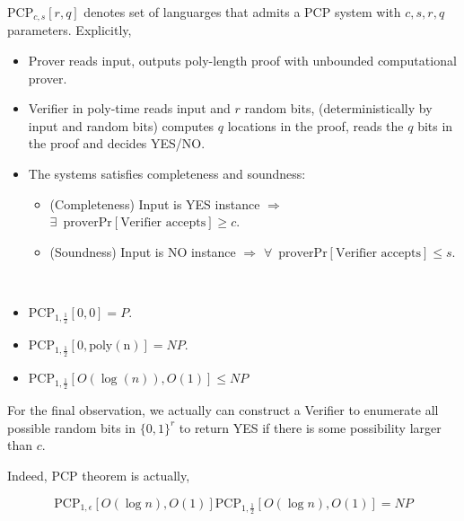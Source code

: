 \begin{definition}
    $ \mathrm{PCP}_{c,s}[r,q] $ denotes set of languarges that admits a PCP system with  $ c,s,r,q  $ parameters. Explicitly,
    \begin{itemize}
        \item Prover reads input, outputs poly-length proof with unbounded computational prover.
        \item Verifier in poly-time reads input and  $ r $ random bits, (deterministically by input and random bits) computes  $ q $ locations in the proof, reads the  $ q $ bits in the proof and decides YES/NO.
        \item The systems satisfies  completeness and soundness:
        \begin{itemize}
            \item (Completeness) Input is YES instance  $ \Rightarrow  $  $ \exists\,\text{ prover}\mathrm{Pr}[\text{Verifier accepts}] \geq c $.
            \item (Soundness) Input is NO instance  $ \Rightarrow  $  $ \forall\,\text{ prover}\mathrm{Pr}[\text{Verifier accepts}] \leq s $. 
        \end{itemize}
    \end{itemize}
\end{definition}
\begin{observation}
    \,
    \begin{itemize}
        \item  $ \mathrm{PCP}_{1,\frac{1}{2}}[0,0]=P $.
        \item  $ \mathrm{PCP}_{1,\frac{1}{2}}[0,\mathrm{poly(n)}]=NP $.
        \item  $ \mathrm{PCP}_{1,\frac{1}{2}}[O(\log(n)),O(1)] \leq NP $   
    \end{itemize}
\end{observation}
For the final observation, we actually can construct a Verifier to enumerate all possible random bits in $ \{0,1\}^r $ to return YES if there is some possibility larger than  $ c $.

Indeed, PCP theorem is actually,
\begin{theorem}
    \[\mathrm{PCP}_{1,\epsilon}[O(\log n),O(1)]\mathrm{PCP}_{1,\frac{1}{2}}[O(\log n),O(1)]=NP \]
\end{theorem}

